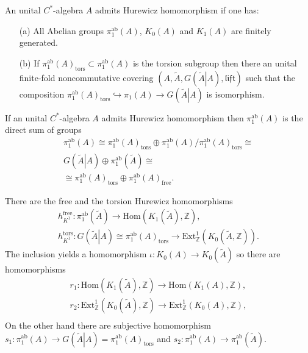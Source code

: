 \documentclass{beamer}
\theoremstyle{plain}
\newcommand{\be}{\begin{equation}}
\newcommand{\ee}{\end{equation}}
\newcommand{\Z}{\mathbb{Z}}                  %
\newcommand{\lift}{\mathfrak{lift}}
\newcommand{\Hom}{\mathrm{Hom}}
\newcommand{\Ext}{\mathrm{Ext}}       %
\newcommand{\bean}{\begin{eqnarray*}}
\newcommand{\eean}{\end{eqnarray*}}
\newcommand{\hookto}{\hookrightarrow}        %
\begin{document}
\begin{frame}
\begin{definition}\label{hurewicz_admits_defn}
	An unital $C^*$-algebra  $A$ \alert{admits  Hurewicz homomorphism} if one has:
	\begin{enumerate}
		\item[(a)] All Abelian groups $\pi^{\mathrm{ab}}_1\left( A\right)$, $K_0\left( A\right)$ and $K_1\left( A\right)$ are finitely generated.
		\item[(b)] If $\pi^{\mathrm{ab}}_1\left( A\right)_{\mathrm{tors}}\subset \pi^{\mathrm{ab}}_1\left( A\right)$ is the torsion subgroup then there  an unital finite-fold noncommutative covering $\left(   A, \widetilde A,  G\left(\left.\widetilde A \right| A \right)  ,  \lift \right)$ such that the composition $\pi^{\mathrm{ab}}_1\left( A\right)_{\mathrm{tors}} \hookto  \pi_1\left( A\right) \to G\left(\left.\widetilde A \right| A \right)$ is isomorphism.
	\end{enumerate}
\end{definition}
	If an  unital $C^*$-algebra  $A$ {admits  Hurewicz homomorphism} then  $\pi^{\mathrm{ab}}_1\left(A\right)$ is the direct sum of groups
	\be\label{h_dir_prod_eqn}
	\begin{split}
		\pi^{\mathrm{ab}}_1\left( A\right)\cong \pi^{\mathrm{ab}}_1\left( A\right)_{\mathrm{tors}}\oplus
		\pi^{\mathrm{ab}}_1\left( A\right)/\pi^{\mathrm{ab}}_1\left( A\right)_{\mathrm{tors}} \cong\\ G\left(\left.\widetilde A \right| A \right) \oplus \pi_1^{\mathrm{ab}}\left(\widetilde A \right)\cong \\ \cong \pi^{\mathrm{ab}}_1\left( A\right)_{\mathrm{tors}}\oplus
		\pi^{\mathrm{ab}}_1\left( A\right)_{\mathrm{free}}. 
\end{split}
\ee
\end{frame}
\begin{frame}
There   are the free  and the torsion  Hurewicz homomorphisms
\bean
h_{K^1}^{\mathrm{free}} : \pi^{\mathrm{ab}}_1\left( \widetilde A\right) \to \Hom\left( K_1\left( \widetilde A\right) , \Z\right),\\
h_{K^1}^{\mathrm{tors}} : G\left(\left.\widetilde A \right| A \right)\cong \pi^{\mathrm{ab}}_1\left( A\right)_{\mathrm{tors}} \to   \Ext^1_\Z\left( K_0\left( \widetilde A, \Z\right)\right).
\eean
The inclusion  yields a homomorphism $\iota :K_0\left( A\right) \to K_0\left(\widetilde A\right)$ so there are homomorphisms 
\bean
r_1 : \Hom\left(K_1\left(\widetilde A\right), \Z \right) \to \Hom\left(K_1\left(A\right), \Z \right),\\
r_2 : \Ext^1_\Z\left(K_0\left(\widetilde A\right), \Z \right) \to \Ext^1_\Z\left(K_0\left(A\right), \Z \right), \\
\eean 
On the other hand there are subjective homomorphism $s_1 : \pi^{\mathrm{ab}}_1\left(A \right) \to  G\left(\left.\widetilde A \right| A \right)=\pi^{\mathrm{ab}}_1\left( A\right)_{\mathrm{tors}}$ and $s_2 : \pi^{\mathrm{ab}}_1\left(A \right) \to \pi^{\mathrm{ab}}_1\left(\widetilde A \right)$.

\end{frame}
\end{document}
